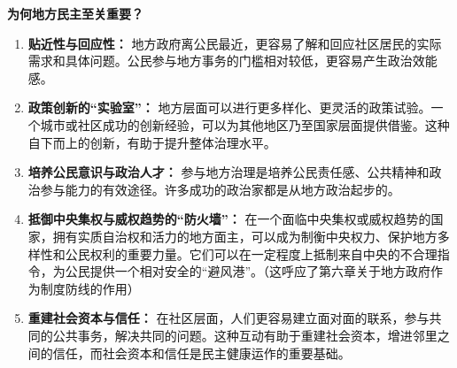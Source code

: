 \documentclass[UTF8, 10pt]{ctexbook}
\begin{document}
\textbf{为何地方民主至关重要？}
\begin{enumerate}
    \item  \textbf{贴近性与回应性：} 地方政府离公民最近，更容易了解和回应社区居民的实际需求和具体问题。公民参与地方事务的门槛相对较低，更容易产生政治效能感。
    \item  \textbf{政策创新的“实验室”：} 地方层面可以进行更多样化、更灵活的政策试验。一个城市或社区成功的创新经验，可以为其他地区乃至国家层面提供借鉴。这种自下而上的创新，有助于提升整体治理水平。
    \item  \textbf{培养公民意识与政治人才：} 参与地方治理是培养公民责任感、公共精神和政治参与能力的有效途径。许多成功的政治家都是从地方政治起步的。
    \item  \textbf{抵御中央集权与威权趋势的“防火墙”：} 在一个面临中央集权或威权趋势的国家，拥有实质自治权和活力的地方面主，可以成为制衡中央权力、保护地方多样性和公民权利的重要力量。它们可以在一定程度上抵制来自中央的不合理指令，为公民提供一个相对安全的“避风港”。（这呼应了第六章关于地方政府作为制度防线的作用）
    \item  \textbf{重建社会资本与信任：} 在社区层面，人们更容易建立面对面的联系，参与共同的公共事务，解决共同的问题。这种互动有助于重建社会资本，增进邻里之间的信任，而社会资本和信任是民主健康运作的重要基础。
\end{enumerate}
\end{document}
